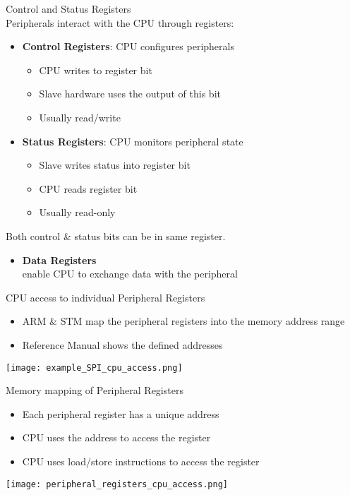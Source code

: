 \begin{concept}{Control and Status Registers}\\
Peripherals interact with the CPU through registers:
\begin{itemize}
    \item \textbf{Control Registers}: CPU configures peripherals
    \begin{itemize}
        \item CPU writes to register bit
        \item Slave hardware uses the output of this bit
        \item Usually read/write
    \end{itemize}
    \item \textbf{Status Registers}: CPU monitors peripheral state
    \begin{itemize}
        \item Slave writes status into register bit
        \item CPU reads register bit
        \item Usually read-only
    \end{itemize}
\end{itemize}
Both control \& status bits can be in same register.
\begin{itemize}
    \item \textbf{Data Registers} \\
        enable CPU to exchange data with the peripheral
\end{itemize}
\end{concept}

\raggedcolumns
\multend



\begin{concept}{CPU access to individual Peripheral Registers}
    \begin{itemize}
        \item ARM \& STM map the peripheral registers into
        the memory address range
        \item Reference Manual shows the defined addresses
    \end{itemize}
    \vspace{2mm}
    \texttt{[image: example\_SPI\_cpu\_access.png]}
\end{concept}


\begin{definition}{Memory mapping of Peripheral Registers}
    \begin{itemize}
        \item Each peripheral register has a unique address
        \item CPU uses the address to access the register
        \item CPU uses load/store instructions to access the register
    \end{itemize}
    \texttt{[image: peripheral\_registers\_cpu\_access.png]}
\end{definition}

